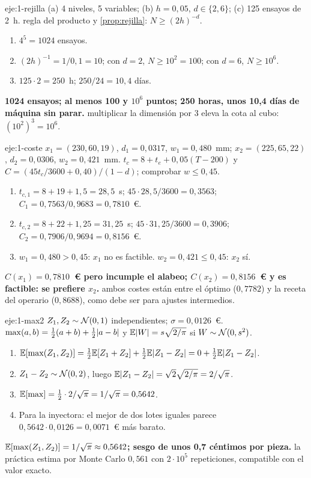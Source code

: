 \begin{solucion}{eje:1-rejilla}
\datos (a) 4 niveles, 5 variables; (b) $h=0{,}05$, $d\in\{2,6\}$; (c) 125 ensayos de 2~h.
\planteamiento regla del producto y \cref{prop:rejilla}: $N\ge(2h)^{-d}$.
\pasos
\begin{enumerate}[label=\arabic*.]
  \item $4^5=1024$ ensayos.
  \item $(2h)^{-1}=1/0{,}1=10$; con $d=2$, $N\ge10^2=100$; con $d=6$, $N\ge10^6$.
  \item $125\cdot2=250$~h; $250/24=10{,}4$ días.
\end{enumerate}
\resultado \textbf{1024 ensayos; al menos 100 y $10^6$ puntos; 250 horas, unos 10,4 días de máquina sin parar.}
\comprobacion multiplicar la dimensión por 3 eleva la cota al cubo: $(10^2)^3=10^6$.
\end{solucion}

\begin{solucion}{eje:1-coste}
\datos $x_1=(230,60,19)$, $d_1=0{,}0317$, $w_1=0{,}480$~mm; $x_2=(225,65,22)$, $d_2=0{,}0306$, $w_2=0{,}421$~mm.
\planteamiento $t_c=8+t_e+0{,}05(T-200)$ y $C=(45t_c/3600+0{,}40)/(1-d)$; comprobar $w\le0{,}45$.
\pasos
\begin{enumerate}[label=\arabic*.]
  \item $t_{c,1}=8+19+1{,}5=28{,}5$~s; $45\cdot28{,}5/3600=0{,}3563$; $C_1=0{,}7563/0{,}9683=0{,}7810$~€.
  \item $t_{c,2}=8+22+1{,}25=31{,}25$~s; $45\cdot31{,}25/3600=0{,}3906$; $C_2=0{,}7906/0{,}9694=0{,}8156$~€.
  \item $w_1=0{,}480>0{,}45$: $x_1$ no es factible. $w_2=0{,}421\le0{,}45$: $x_2$ sí.
\end{enumerate}
\resultado \textbf{$C(x_1)=0{,}7810$~€ pero incumple el alabeo; $C(x_2)=0{,}8156$~€ y es factible: se prefiere $x_2$.}
\comprobacion ambos costes están entre el óptimo ($0{,}7782$) y la receta del operario ($0{,}8688$), como debe ser para ajustes intermedios.
\end{solucion}

\begin{solucion}{eje:1-max2}
\datos $Z_1,Z_2\sim\mathcal{N}(0,1)$ independientes; $\sigma=0{,}0126$~€.
\planteamiento $\max(a,b)=\frac12(a+b)+\frac12\lvert a-b\rvert$ y $\mathbb{E}\lvert W\rvert=s\sqrt{2/\pi}$ si $W\sim\mathcal{N}(0,s^2)$.
\pasos
\begin{enumerate}[label=\arabic*.]
  \item $\mathbb{E}[\max(Z_1,Z_2)]=\frac12\mathbb{E}[Z_1+Z_2]+\frac12\mathbb{E}\lvert Z_1-Z_2\rvert=0+\frac12\mathbb{E}\lvert Z_1-Z_2\rvert$.
  \item $Z_1-Z_2\sim\mathcal{N}(0,2)$, luego $\mathbb{E}\lvert Z_1-Z_2\rvert=\sqrt2\sqrt{2/\pi}=2/\sqrt\pi$.
  \item $\mathbb{E}[\max]=\frac12\cdot2/\sqrt\pi=1/\sqrt\pi=0{,}5642$.
  \item Para la inyectora: el mejor de dos lotes iguales parece $0{,}5642\cdot0{,}0126=0{,}0071$~€ más barato.
\end{enumerate}
\resultado \textbf{$\mathbb{E}[\max(Z_1,Z_2)]=1/\sqrt\pi\approx0{,}5642$; sesgo de unos 0,7 céntimos por pieza.}
\comprobacion la práctica estima por Monte Carlo $0{,}561$ con $2\cdot10^5$ repeticiones, compatible con el valor exacto.
\end{solucion}

